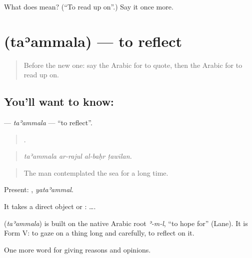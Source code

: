 \begin{tcolorbox}[breakable,colback=teal!4,colframe=teal!35!black,title={Before you move on}]
What does  mean? (\textquotedblleft{}To read up on\textquotedblright{}.) Say it once more.
\end{tcolorbox}
\section[\texorpdfstring{\ar{تأمل} (taʾammala)}{تأمل (taʾammala)}]{ (taʾammala) — to reflect}

\label{lesson:AR-C395-taammala}



\begin{quote}
Before the new one: say the Arabic for to quote, then the Arabic for to read up on.
\end{quote}

\subsection*{You'll want to know: }
\textbf{} — \emph{taʾammala} — \textquotedblleft{}to reflect\textquotedblright{}.

\begin{quote}
   .
\end{quote}

\begin{quote}
\emph{taʾammala ar-rajul al-baḥr ṭawīlan.}
\end{quote}

\begin{quote}
The man contemplated the sea for a long time.
\end{quote}

Present: , \emph{yataʾammal}.

It takes a direct object or :   ….

\begin{cousinweb}
\textbf{} (\emph{taʾammala}) is built on the native Arabic root \emph{ʾ-m-l}, \textquotedblleft{}to hope for\textquotedblright{} (Lane). It is Form V: to gaze on a thing long and carefully, to reflect on it.
\end{cousinweb}

\begin{grammarlens}[title={What you've built}]
One more word for giving reasons and opinions.
\end{grammarlens}

